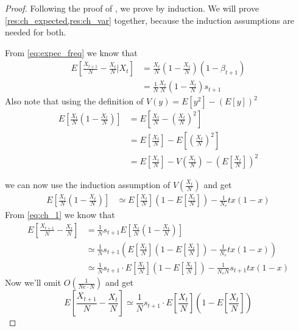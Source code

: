 \documentclass[12pt]{extarticle}
\begin{document}
\begin{proof}
Following the proof of \citet{changeEnv}, we prove by induction. We will prove \cref{res:ch_expected,res:ch_var} together, because the induction assumptions are needed for both.

From \cref{eq:expec_freq} we know that
\begin{equation}\label{eq:ch_1}
\begin{split}
E\left[\frac{X_{t+1}}{N}-\frac{X_t}{N}\bigg|X_t\right] &= \frac{X_t}{N}\left(1-\frac{X_t}{N}\right)(1-\beta_{t+1}) \\
&= \frac{1}{N}\frac{X_t}{N}\left(1-\frac{X_t}{N}\right)s_{t+1}
\end{split}
\end{equation}
Also note that using the definition of $V(y)=E[y^2]-(E[y])^2$
\begin{equation}
\begin{split}
E\left[\frac{X_t}{N}\left(1-\frac{X_t}{N}\right)\right] &= E\left[\frac{X_t}{N}-\left(\frac{X_t}{N}\right)^2\right] \\
&= E\left[\frac{X_t}{N}\right]-E\left[\left(\frac{X_t}{N}\right)^2\right] \\
&= E\left[\frac{X_t}{N}\right] - V\left(\frac{X_t}{N}\right) - \left(E\left[\frac{X_t}{N}\right]\right)^2
\end{split}
\end{equation}

we can now use the induction assumption of $V(\frac{X_t}{N})$ and get
\begin{equation}
\begin{split}
E\left[\frac{X_t}{N}\left(1-\frac{X_t}{N}\right)\right] &\simeq
E\left[\frac{X_t}{N}\right]\left(1-E\left[\frac{X_t}{N}\right]\right)-\frac{1}{N_e}tx(1-x)
\end{split}
\end{equation}
From \cref{eq:ch_1} we know that
\begin{equation}
\begin{split}
E\left[\frac{X_{t+1}}{N}-\frac{X_t}{N}\right] &= \frac{1}{N}s_{t+1}E\left[\frac{X_t}{N}\left(1-\frac{X_t}{N}\right)\right] \\
&\simeq \frac{1}{N}s_{t+1}\left(E\left[\frac{X_t}{N}\right]\left(1-E\left[\frac{X_t}{N}\right]\right) - \frac{1}{N_e}tx(1-x)\right) \\
&\simeq \frac{1}{N}s_{t+1}\cdot E\left[\frac{X_t}{N}\right]\left(1-E\left[\frac{X_t}{N}\right]\right) - \frac{1}{N_e N}s_{t+1}tx(1-x)
\end{split}
\end{equation}
Now we'll omit $O(\frac{1}{Ne\cdot N})$ and get
\begin{equation}\label{eq:ch_2}
E\left[\frac{X_{t+1}}{N}-\frac{X_t}{N}\right] \simeq \frac{1}{N}s_{t+1}\cdot E\left[\frac{X_t}{N}\right]\left(1-E\left[\frac{X_t}{N}\right]\right)
\end{equation}


\end{proof}
\end{document}
